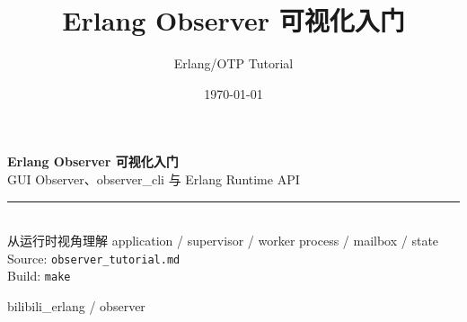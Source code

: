 \documentclass[a4paper,11pt]{article}
\title{\sffamily\bfseries\color{headerteal} Erlang Observer 可视化入门}
\author{Erlang/OTP Tutorial}
\date{\today}
\begin{document}
\begin{titlepage}
  \thispagestyle{empty}
  \vspace*{2.5cm}
  \begin{center}
    {\Huge\bfseries\sffamily\color{headerteal} Erlang Observer 可视化入门\\[10pt]}
    {\Large\sffamily GUI Observer、observer\_cli 与 Erlang Runtime API\\[24pt]}
    \rule{0.72\linewidth}{0.8pt}\\[18pt]
    {\large\sffamily 从运行时视角理解 application / supervisor / worker process / mailbox / state}\\[36pt]
    {\normalsize\sffamily Source: \texttt{observer\_tutorial.md}}\\[6pt]
    {\normalsize\sffamily Build: \texttt{make}}
  \end{center}
  \vfill
  \begin{center}
    {\small\sffamily bilibili\_erlang / observer}
  \end{center}
\end{titlepage}

\tableofcontents
\clearpage


\end{document}

